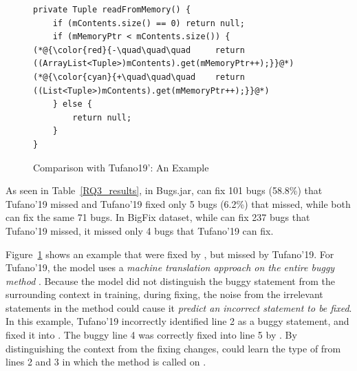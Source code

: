 \begin{figure}[t]
	\centering
	\begin{lstlisting}[]
private Tuple readFromMemory() {
    if (mContents.size() == 0) return null;
    if (mMemoryPtr < mContents.size()) {
(*@{\color{red}{-\quad\quad\quad     return ((ArrayList<Tuple>)mContents).get(mMemoryPtr++);}}@*)
(*@{\color{cyan}{+\quad\quad\quad    return ((List<Tuple>)mContents).get(mMemoryPtr++);}}@*)
	} else {
        return null;
	}
}
	\end{lstlisting}
        \vspace{-15pt}
	\caption{Comparison with Tufano19': An Example}
	\label{example_tufano19}
\end{figure}

As seen in Table~\ref{RQ3_results}, in Bugs.jar, {\tool} can fix 101
bugs (58.8\%) that Tufano'19 missed and Tufano'19 fixed only 5 bugs
(6.2\%) that {\tool} missed, while both can fix the same 71 bugs.
In BigFix dataset, while {\tool} can fix 237 bugs that Tufano'19
missed, it missed only 4 bugs that Tufano'19 can fix.

Figure~\ref{example_tufano19} shows an example that were fixed by
{\tool}, but missed by Tufano'19. For Tufano'19, the model uses a
{\em machine translation approach on the entire buggy method}
.  Because the model did not distinguish the
buggy statement from the surrounding context in training, during
fixing, the noise from the irrelevant statements in the method could
cause it {\em predict an incorrect statement to be fixed}. In this
example, Tufano'19 incorrectly identified line 2 as a buggy statement,
and fixed it into   \code{()}
\code{==}   . The buggy line 4 was
correctly fixed into line 5 by {\tool}. By distinguishing the context
from the fixing changes, {\tool} could learn the type  of
 from lines 2 and 3 in which the method  is
called on .


